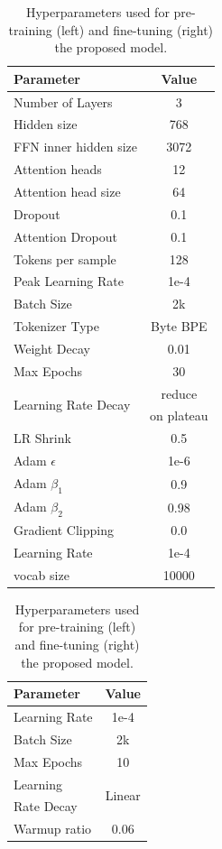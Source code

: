 \begin{table}
\begin{subtable}{0.45\linewidth}
    \footnotesize
    \centering
    \begin{tabular}{lc}
        \toprule
        Parameter & Value \\
        \midrule
        Number of Layers & 3 \\
        Hidden size & 768 \\
        FFN inner hidden size & 3072 \\
        Attention heads & 12 \\
        Attention head size & 64 \\
        Dropout & 0.1 \\
        Attention Dropout & 0.1 \\
        Tokens per sample & 128 \\
        Peak Learning Rate & 1e-4 \\
        Batch Size & 2k \\
        Tokenizer Type & Byte BPE\\
        Weight Decay & 0.01 \\
        Max Epochs & 30 \\
        \multirow{2}{*}{Learning Rate Decay} & reduce \\
         & on plateau \\
        LR Shrink & 0.5 \\
        Adam $\epsilon$ & 1e-6 \\
        Adam $\beta_1$ & 0.9 \\
        Adam $\beta_2$ & 0.98 \\
        Gradient Clipping & 0.0 \\
        Learning Rate & 1e-4 \\
        vocab size & 10000 \\
      \bottomrule
    \end{tabular}
\end{subtable} %
\begin{subtable}{0.45\linewidth}
    \footnotesize
    \centering
	\begin{tabular}{lc}
        \toprule
		Parameter & Value \\
        \midrule
		Learning Rate & 1e-4 \\
		Batch Size & 2k \\
		Max Epochs & 10 \\
		Learning  & \multirow{2}{*}{Linear} \\
		Rate Decay & \\
		Warmup ratio & 0.06 \\
		\bottomrule
	\end{tabular}
\end{subtable}
\caption{Hyperparameters used for pre-training (left) and fine-tuning (right) the proposed \URLTranSysc model.}
\label{tab:urltran:TransParamsCustVoc}
\end{table}
